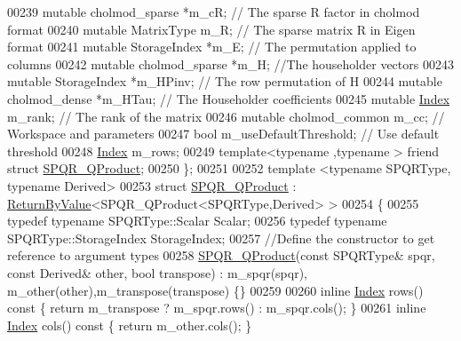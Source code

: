 \begin{DoxyCode}
00239     \textcolor{keyword}{mutable} cholmod\_sparse *m\_cR; \textcolor{comment}{// The sparse R factor in cholmod format}
00240     \textcolor{keyword}{mutable} MatrixType m\_R; \textcolor{comment}{// The sparse matrix R in Eigen format}
00241     \textcolor{keyword}{mutable} StorageIndex *m\_E; \textcolor{comment}{// The permutation applied to columns}
00242     \textcolor{keyword}{mutable} cholmod\_sparse *m\_H;  \textcolor{comment}{//The householder vectors}
00243     \textcolor{keyword}{mutable} StorageIndex *m\_HPinv; \textcolor{comment}{// The row permutation of H}
00244     \textcolor{keyword}{mutable} cholmod\_dense *m\_HTau; \textcolor{comment}{// The Householder coefficients}
00245     \textcolor{keyword}{mutable} \hyperlink{namespace_eigen_a62e77e0933482dafde8fe197d9a2cfde}{Index} m\_rank; \textcolor{comment}{// The rank of the matrix}
00246     \textcolor{keyword}{mutable} cholmod\_common m\_cc; \textcolor{comment}{// Workspace and parameters}
00247     \textcolor{keywordtype}{bool} m\_useDefaultThreshold;     \textcolor{comment}{// Use default threshold}
00248     \hyperlink{namespace_eigen_a62e77e0933482dafde8fe197d9a2cfde}{Index} m\_rows;
00249     \textcolor{keyword}{template}<\textcolor{keyword}{typename} ,\textcolor{keyword}{typename} > \textcolor{keyword}{friend} \textcolor{keyword}{struct }\hyperlink{struct_eigen_1_1_s_p_q_r___q_product}{SPQR\_QProduct};
00250 \};
00251 
00252 \textcolor{keyword}{template} <\textcolor{keyword}{typename} SPQRType, \textcolor{keyword}{typename} Derived>
00253 \textcolor{keyword}{struct }\hyperlink{struct_eigen_1_1_s_p_q_r___q_product}{SPQR\_QProduct} : \hyperlink{group___core___module_class_eigen_1_1_return_by_value}{ReturnByValue}<SPQR\_QProduct<SPQRType,Derived> >
00254 \{
00255   \textcolor{keyword}{typedef} \textcolor{keyword}{typename} SPQRType::Scalar Scalar;
00256   \textcolor{keyword}{typedef} \textcolor{keyword}{typename} SPQRType::StorageIndex StorageIndex;
00257   \textcolor{comment}{//Define the constructor to get reference to argument types}
00258   \hyperlink{struct_eigen_1_1_s_p_q_r___q_product}{SPQR\_QProduct}(\textcolor{keyword}{const} SPQRType& spqr, \textcolor{keyword}{const} Derived& other, \textcolor{keywordtype}{bool} transpose) : m\_spqr(spqr),
      m\_other(other),m\_transpose(transpose) \{\}
00259   
00260   \textcolor{keyword}{inline} \hyperlink{namespace_eigen_a62e77e0933482dafde8fe197d9a2cfde}{Index} rows()\textcolor{keyword}{ const }\{ \textcolor{keywordflow}{return} m\_transpose ? m\_spqr.rows() : m\_spqr.cols(); \}
00261   \textcolor{keyword}{inline} \hyperlink{namespace_eigen_a62e77e0933482dafde8fe197d9a2cfde}{Index} cols()\textcolor{keyword}{ const }\{ \textcolor{keywordflow}{return} m\_other.cols(); \}

\end{DoxyCode}
